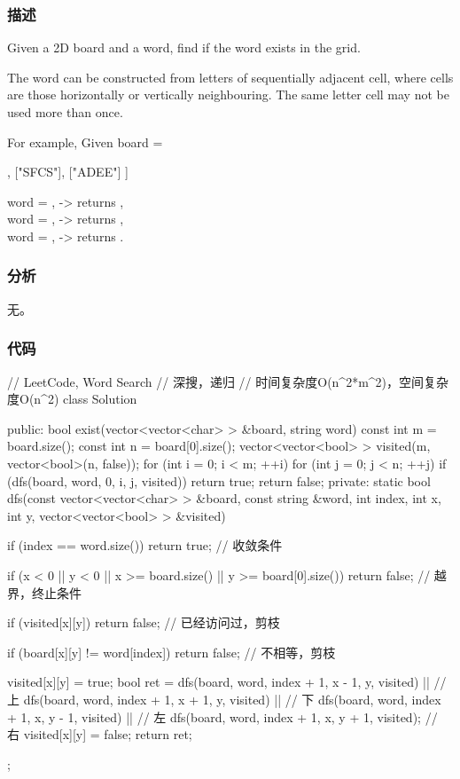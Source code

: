 \subsubsection{描述}
Given a 2D board and a word, find if the word exists in the grid.

The word can be constructed from letters of sequentially adjacent cell, where  cells are those horizontally or vertically neighbouring. The same letter cell may not be used more than once.

For example,
Given board =
\begin{Code}
[
  ["ABCE"],
  ["SFCS"],
  ["ADEE"]
]
\end{Code}
word = , -> returns ,\\
word = , -> returns ,\\
word = , -> returns .


\subsubsection{分析}
无。


\subsubsection{代码}
\begin{Code}
// LeetCode, Word Search
// 深搜，递归
// 时间复杂度O(n^2*m^2)，空间复杂度O(n^2)
class Solution {
public:
    bool exist(vector<vector<char> > &board, string word) {
        const int m = board.size();
        const int n = board[0].size();
        vector<vector<bool> > visited(m, vector<bool>(n, false));
        for (int i = 0; i < m; ++i)
            for (int j = 0; j < n; ++j)
                if (dfs(board, word, 0, i, j, visited))
                    return true;
        return false;
    }
private:
    static bool dfs(const vector<vector<char> > &board, const string &word,
            int index, int x, int y, vector<vector<bool> > &visited) {
        if (index == word.size())
            return true; // 收敛条件

        if (x < 0 || y < 0 || x >= board.size() || y >= board[0].size())
            return false;  // 越界，终止条件

        if (visited[x][y]) return false; // 已经访问过，剪枝

        if (board[x][y] != word[index]) return false; // 不相等，剪枝

        visited[x][y] = true;
        bool ret = dfs(board, word, index + 1, x - 1, y, visited) || // 上
                dfs(board, word, index + 1, x + 1, y, visited)    || // 下
                dfs(board, word, index + 1, x, y - 1, visited)    || // 左
                dfs(board, word, index + 1, x, y + 1, visited);      // 右
        visited[x][y] = false;
        return ret;
    }
};
\end{Code}


